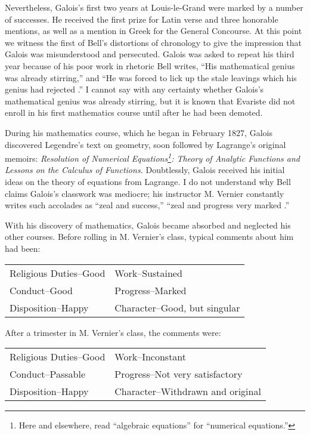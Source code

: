 \documentclass[12pt]{article}
\begin{document}
Nevertheless, Galois's first two years at Louis-le-Grand were marked by a number of successes. He received the first prize for Latin verse and three honorable mentions, as well as a mention in Greek for the General Concourse. At this point we witness the first of Bell's distortions of chronology to give the impression that Galois was misunderstood and persecuted. Galois was asked to repeat his third year because of his poor work in rhetoric Bell writes, ``His mathematical genius was already stirring,'' and ``He was forced to lick up the stale leavings which his genius had rejected \cite{17}.'' I cannot say with any certainty whether Galois's mathematical genius was already stirring, but it is known that Evariste did not enroll in his first mathematics course until after he had been demoted.

During his mathematics course, which he began in February 1827, Galois discovered Legendre's text on geometry, soon followed by Lagrange's original memoirs: \emph{Resolution of Numerical Equations\footnote{Here and elsewhere, read ``algebraic equations'' for ``numerical equations.''}: Theory of Analytic Functions and Lessons on the Calculus of Functions.} Doubtlessly, Galois received his initial ideas on the theory of equations from Lagrange. I do not understand why Bell claims Galois's classwork was mediocre; his instructor M. Vernier constantly writes such accolades as ``zeal and success,'' ``zeal and progress very marked \cite{18}.''

With his discovery of mathematics, Galois became absorbed and neglected his other courses. Before rolling in M. Vernier's class, typical comments about him had been:

\medskip
\begin{tabular}{ll}
Religious Duties--Good &Work--Sustained\\
Conduct--Good & Progress--Marked\\
Disposition--Happy & Character--Good, but singular
\end{tabular}
\medskip

\noindent
After a trimester in M. Vernier's class, the comments were:

\medskip
\begin{tabular}{ll}
Religious Duties--Good & Work--Inconstant \\
Conduct--Passable & Progress--Not very satisfactory \\
Disposition--Happy & Character--Withdrawn and original\\
\end{tabular}
\medskip
\end{document}

